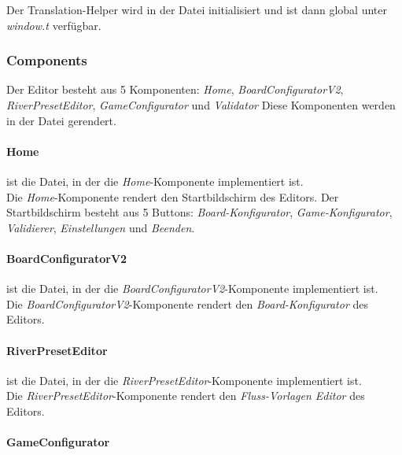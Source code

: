 Der Translation-Helper wird in der Datei  initialisiert und ist dann global unter \emph{window.t} verfügbar.

\subsubsection{Components}

Der Editor besteht aus 5 Komponenten: \emph{Home}, \emph{BoardConfiguratorV2}, \emph{RiverPresetEditor}, \emph{GameConfigurator} und \emph{Validator}
Diese Komponenten werden in der Datei  gerendert.

\paragraph{Home}

 ist die Datei, in der die \emph{Home}-Komponente implementiert ist.\\

Die \emph{Home}-Komponente rendert den Startbildschirm des Editors.
Der Startbildschirm besteht aus 5 Buttons: \emph{Board-Konfigurator}, \emph{Game-Konfigurator}, \emph{Validierer}, \emph{Einstellungen} und \emph{Beenden}.

\paragraph{BoardConfiguratorV2}

 ist die Datei, in der die \emph{BoardConfiguratorV2}-Komponente implementiert ist.\\

Die \emph{BoardConfiguratorV2}-Komponente rendert den \emph{Board-Konfigurator} des Editors.

\paragraph{RiverPresetEditor}

 ist die Datei, in der die \emph{RiverPresetEditor}-Komponente implementiert ist.\\

Die \emph{RiverPresetEditor}-Komponente rendert den \emph{Fluss-Vorlagen Editor} des Editors.

\paragraph{GameConfigurator}


